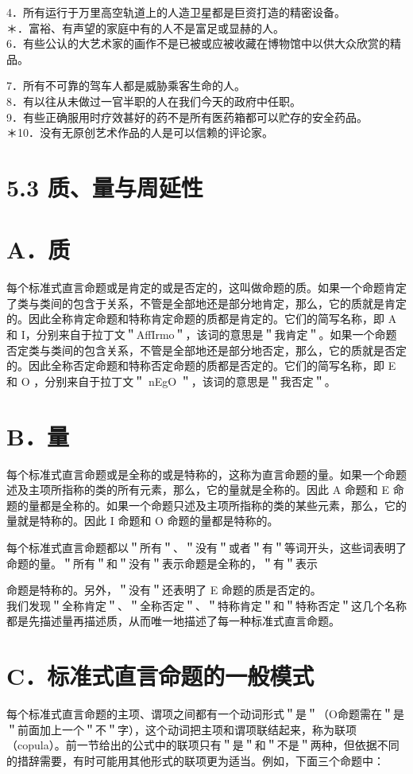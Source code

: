 4．所有运行于万里高空轨道上的人造卫星都是巨资打造的精密设备。\\
＊．富裕、有声望的家庭中有的人不是富足或显赫的人。\\
6．有些公认的大艺术家的画作不是已被或应被收藏在博物馆中以供大众欣赏的精品。

7．所有不可靠的驾车人都是威胁乘客生命的人。\\
8．有以往从未做过一官半职的人在我们今天的政府中任职。\\
9．有些正确服用时疗效甚好的药不是所有医药箱都可以贮存的安全药品。\\
＊10．没有无原创艺术作品的人是可以信赖的评论家。

\section*{5.3 质、量与周延性}
\section*{A．质}
每个标准式直言命题或是肯定的或是否定的，这叫做命题的质。如果一个命题肯定了类与类间的包含于关系，不管是全部地还是部分地肯定，那么，它的质就是肯定的。因此全称肯定命题和特称肯定命题的质都是肯定的。它们的简写名称，即 A 和 I，分别来自于拉丁文＂AffIrmo＂，该词的意思是＂我肯定＂。如果一个命题否定类与类间的包含关系，不管是全部地还是部分地否定，那么，它的质就是否定的。因此全称否定命题和特称否定命题的质都是否定的。它们的简写名称，即 E 和 O ，分别来自于拉丁文＂ nEgO ＂，该词的意思是＂我否定＂。

\section*{B．量}
每个标准式直言命题或是全称的或是特称的，这称为直言命题的量。如果一个命题述及主项所指称的类的所有元素，那么，它的量就是全称的。因此 A 命题和 E 命题的量都是全称的。如果一个命题只述及主项所指称的类的某些元素，那么，它的量就是特称的。因此 I 命题和 O 命题的量都是特称的。

每个标准式直言命题都以＂所有＂、＂没有＂或者＂有＂等词开头，这些词表明了命题的量。＂所有＂和＂没有＂表示命题是全称的，＂有＂表示

命题是特称的。另外，＂没有＂还表明了 E 命题的质是否定的。\\
我们发现＂全称肯定＂、＂全称否定＂、＂特称肯定＂和＂特称否定＂这几个名称都是先描述量再描述质，从而唯一地描述了每一种标准式直言命题。

\section*{C．标准式直言命题的一般模式}
每个标准式直言命题的主项、谓项之间都有一个动词形式＂是＂（O命题需在＂是＂前面加上一个＂不＂字），这个动词把主项和谓项联结起来，称为联项（copula）。前一节给出的公式中的联项只有＂是＂和＂不是＂两种，但依据不同的措辞需要，有时可能用其他形式的联项更为适当。例如，下面三个命题中：

